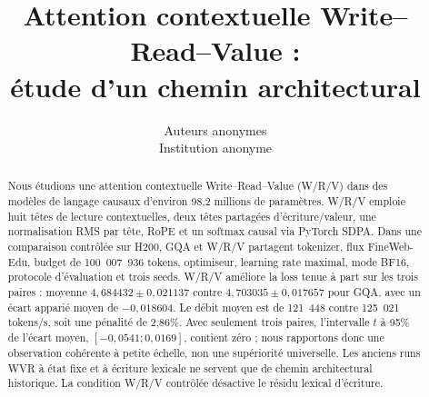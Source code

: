 \documentclass[10pt]{article}
\title{Attention contextuelle Write--Read--Value :\\étude d'un chemin architectural}
\author{\name Auteurs anonymes \\
        \addr Institution anonyme}
\begin{document}
\maketitle

\begin{abstract}
Nous étudions une attention contextuelle Write--Read--Value (W/R/V) dans des modèles de langage causaux d'environ 98,2 millions de paramètres. W/R/V emploie huit têtes de lecture contextuelles, deux têtes partagées d'écriture/valeur, une normalisation RMS par tête, RoPE et un softmax causal via PyTorch SDPA. Dans une comparaison contrôlée sur H200, GQA et W/R/V partagent tokenizer, flux FineWeb-Edu, budget de 100~007~936 tokens, optimiseur, learning rate maximal, mode BF16, protocole d'évaluation et trois seeds. W/R/V améliore la loss tenue à part sur les trois paires : moyenne $4,684432\pm0,021137$ contre $4,703035\pm0,017657$ pour GQA, avec un écart apparié moyen de $-0,018604$. Le débit moyen est de 121~448 contre 125~021 tokens/s, soit une pénalité de 2,86\%. Avec seulement trois paires, l'intervalle $t$ à 95\% de l'écart moyen, $[-0,0541;0,0169]$, contient zéro ; nous rapportons donc une observation cohérente à petite échelle, non une supériorité universelle. Les anciens runs WVR à état fixe et à écriture lexicale ne servent que de chemin architectural historique. La condition W/R/V contrôlée désactive le résidu lexical d'écriture.
\end{abstract}












\appendix

\end{document}

